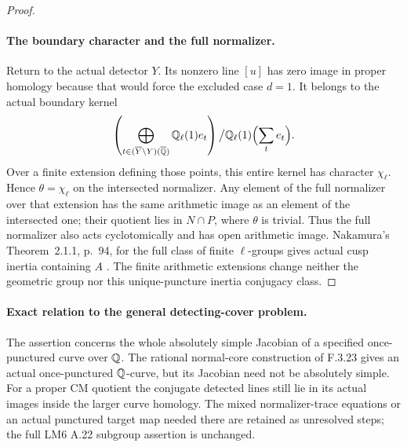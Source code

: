\begin{proof}
\paragraph{The boundary character and the full normalizer.}
Return to the actual detector $Y$. Its nonzero
line $[u]$ has zero image in proper homology
because that would force the excluded case
$d=1$. It belongs to the actual boundary kernel
\[
 \left(\bigoplus_{t\in(\overline Y\setminus Y)(\overline{\mathbb Q})}
          \mathbb Q_\ell(1)e_t\right)
 \big/\mathbb Q_\ell(1)\Bigl(\sum_t e_t\Bigr).
\]
Over a finite extension defining those points,
this entire kernel has character $\chi_\ell$.
Hence $\theta=\chi_\ell$ on the intersected
normalizer. Any element of the full normalizer
over that extension has the same arithmetic
image as an element of the intersected one;
their quotient lies in $N\cap P$, where
$\theta$ is trivial. Thus the full normalizer
also acts cyclotomically and has open arithmetic
image. Nakamura's Theorem~2.1.1, p.~94, for
the full class of finite $\ell$-groups gives
actual cusp inertia containing $A$
\cite{AuditNakamura1994}. The finite arithmetic
extensions change neither the geometric group
nor this unique-puncture inertia conjugacy class.
\end{proof}

\paragraph{Exact relation to the general detecting-cover problem.}
The assertion concerns the whole absolutely simple
Jacobian of a specified once-punctured curve over
$\mathbb Q$. The rational normal-core construction of
F.3.23 gives an actual once-punctured $\mathbb Q$-curve,
but its Jacobian need not be absolutely simple.
For a proper CM quotient the conjugate detected
lines still lie in its actual images inside the
larger curve homology. The mixed normalizer-trace
equations or an actual punctured target map
needed there are retained as unresolved steps;
the full LM6 A.22 subgroup assertion is unchanged.


